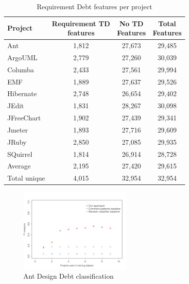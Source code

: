 \begin{table}[!hbt]
    \begin{center}
        \caption{Requirement Debt features per project}
        \label{tbl:requirement_features_per_project}
        \begin{tabular}{l| c c c }
        \toprule
        \textbf{Project} & \thead{Requirement TD\\features} & \thead{No TD\\Features} & \thead{Total\\Features} \\
        \midrule
        Ant           & 1,812 & 27,673 & 29,485  \\
        ArgoUML       & 2,779 & 27,260 & 30,039  \\
        Columba       & 2,433 & 27,561 & 29,994  \\
        EMF           & 1,889 & 27,637 & 29,526  \\
        Hibernate     & 2,748 & 26,654 & 29,402  \\
        JEdit         & 1,831 & 28,267 & 30,098  \\
        JFreeChart    & 1,902 & 27,439 & 29,341  \\
        Jmeter        & 1,893 & 27,716 & 29,609  \\
        JRuby         & 2,850 & 27,085 & 29,935  \\
        SQuirrel      & 1,814 & 26,914 & 28,728  \\
        \midrule
        Average       & 2,195  & 27,420 & 29,615 \\      
        Total unique  & 4,015  & 32,954 & 32,954 \\
        \bottomrule
        \end{tabular}
    \end{center}    
\end{table}

\clearpage

\begin{figure}[thb!]
  \centering
  \includegraphics[width=0.50\textwidth]{figures/design_ant.pdf}
  \vspace{-3mm}
  \caption{Ant Design Debt classification}
  \label{fig:design_ant}
\end{figure}


